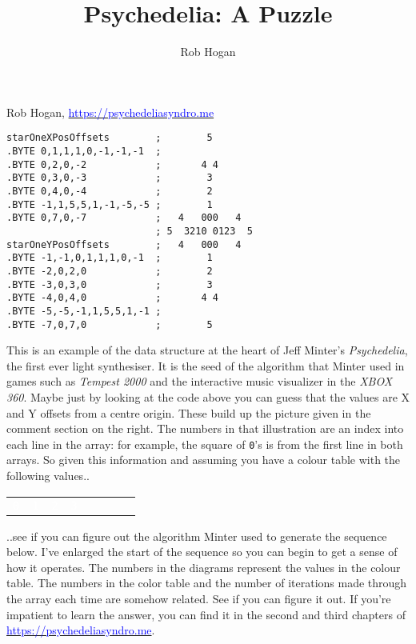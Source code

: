 \documentclass[pagedoutpaper,twocolumn,9pt]{pagedout}
\title{Psychedelia: A Puzzle}
\author{Rob Hogan}
\makeatletter
\newcommand*{\icode}[1]{{\texttt{#1}}}
\renewcommand{\maketitle}{
\begin{flushleft}
{\noindent\Huge\bf\@title}\break
\end{flushleft}
}
\makeatother
\begin{document}
    
\maketitle
\vspace{-0.8cm}
Rob Hogan, \href{https://psychedeliasyndro.me}{\textcolor{blue}{https://psychedeliasyndro.me}}
\begin{lstlisting}[basicstyle=\ttfamily\small]
starOneXPosOffsets        ;        5       
.BYTE 0,1,1,1,0,-1,-1,-1  ;                
.BYTE 0,2,0,-2            ;       4 4                                       
.BYTE 0,3,0,-3            ;        3                                        
.BYTE 0,4,0,-4            ;        2                                        
.BYTE -1,1,5,5,1,-1,-5,-5 ;        1       
.BYTE 0,7,0,-7            ;   4   000   4                                   
                          ; 5  3210 0123  5                  
starOneYPosOffsets        ;   4   000   4  
.BYTE -1,-1,0,1,1,1,0,-1  ;        1                                        
.BYTE -2,0,2,0            ;        2                                        
.BYTE -3,0,3,0            ;        3                                        
.BYTE -4,0,4,0            ;       4 4      
.BYTE -5,-5,-1,1,5,5,1,-1 ;                                                 
.BYTE -7,0,7,0            ;        5       
\end{lstlisting}   
This is an example of the data structure at the heart of Jeff Minter's \textit{Psychedelia}, the
first ever light synthesiser. It is the seed of the algorithm that Minter used in games such as
\textit{Tempest 2000} and the interactive music visualizer in the \textit{XBOX 360}. Maybe just
by looking at the code above you can guess that the values are X and Y offsets from a centre origin.
These build up the picture given in the comment section on the right. The numbers in that illustration
are an index into each line in the array: for example, the square of \icode{0}'s is from the first line in
both arrays. So given this information and assuming you have a colour table with the following values..
\begin{adjustbox}{width=5cm,center}
  \begin{tabular}{cccccccc}
    \cellcolor[HTML]{000000}\textcolor{white}{\icode{0}} & \cellcolor{c64_blue}\textcolor{white}{\icode{1}} &
    \cellcolor{c64_red}\textcolor{white}{\icode{2}} & \cellcolor{c64_purple}\textcolor{white}{\icode{3}} &
    \cellcolor{c64_green}\icode{4} & \cellcolor{c64_cyan}\icode{5} &
    \cellcolor{c64_yellow}\icode{6} & \cellcolor{c64_white}\icode{7}  \\
  \end{tabular}
\end{adjustbox}
..see if you can figure out the algorithm Minter used to generate the sequence below. I've enlarged the 
start of the sequence so you can begin to get a sense of how it operates. The numbers in the diagrams
represent the values in the colour table. The numbers in the color table and the number of iterations
made through the array each time are somehow related. See if you can figure it out.
If you're impatient to learn the answer, you can find it in the second and third chapters of 
\href{https://psychedeliasyndro.me}{\textcolor{blue}{https://psychedeliasyndro.me}}.
\end{document}
